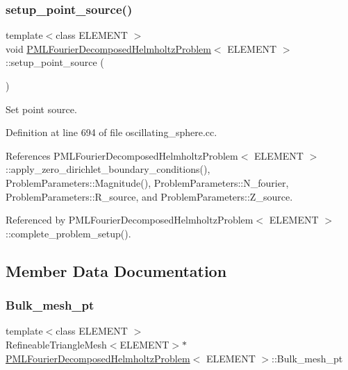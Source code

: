 \subsubsection{\texorpdfstring{setup\+\_\+point\+\_\+source()}{setup\_point\_source()}}
{\footnotesize\ttfamily template$<$class E\+L\+E\+M\+E\+NT $>$ \\
void \hyperlink{classPMLFourierDecomposedHelmholtzProblem}{P\+M\+L\+Fourier\+Decomposed\+Helmholtz\+Problem}$<$ E\+L\+E\+M\+E\+NT $>$\+::setup\+\_\+point\+\_\+source (\begin{DoxyParamCaption}{ }\end{DoxyParamCaption})\hspace{0.3cm}{\ttfamily [private]}}



Set point source. 



Definition at line 694 of file oscillating\+\_\+sphere.\+cc.



References P\+M\+L\+Fourier\+Decomposed\+Helmholtz\+Problem$<$ E\+L\+E\+M\+E\+N\+T $>$\+::apply\+\_\+zero\+\_\+dirichlet\+\_\+boundary\+\_\+conditions(), Problem\+Parameters\+::\+Magnitude(), Problem\+Parameters\+::\+N\+\_\+fourier, Problem\+Parameters\+::\+R\+\_\+source, and Problem\+Parameters\+::\+Z\+\_\+source.



Referenced by P\+M\+L\+Fourier\+Decomposed\+Helmholtz\+Problem$<$ E\+L\+E\+M\+E\+N\+T $>$\+::complete\+\_\+problem\+\_\+setup().



\subsection{Member Data Documentation}
\mbox{\label{classPMLFourierDecomposedHelmholtzProblem_ad20477e869fb9ce66891389c0d501449}} 
\subsubsection{\texorpdfstring{Bulk\+\_\+mesh\+\_\+pt}{Bulk\_mesh\_pt}\hspace{0.1cm}{\footnotesize\ttfamily [1/2]}}
{\footnotesize\ttfamily template$<$class E\+L\+E\+M\+E\+NT $>$ \\
Refineable\+Triangle\+Mesh$<$E\+L\+E\+M\+E\+NT$>$$\ast$ \hyperlink{classPMLFourierDecomposedHelmholtzProblem}{P\+M\+L\+Fourier\+Decomposed\+Helmholtz\+Problem}$<$ E\+L\+E\+M\+E\+NT $>$\+::Bulk\+\_\+mesh\+\_\+pt\hspace{0.3cm}{\ttfamily [private]}}



